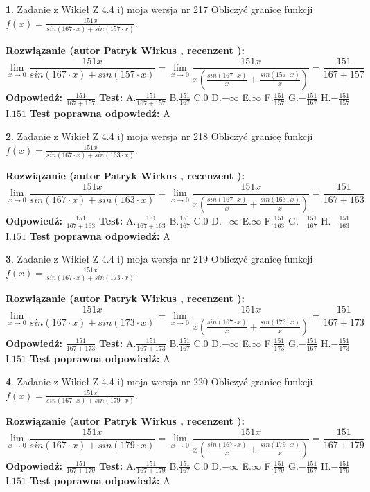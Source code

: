 \documentclass[12pt, a4paper]{article}
\theoremstyle{definition} %
\newtheorem{zad}{}
\newcommand{\zadStart}[1]{\begin{zad}#1\newline}
\newcommand{\zadStop}{\end{zad}}
\newcommand{\rozwStart}[2]{\noindent \textbf{Rozwiązanie (autor #1 , recenzent #2): }\newline}
\newcommand{\rozwStop}{\newline}
\newcommand{\odpStart}{\noindent \textbf{Odpowiedź:}\newline}
\newcommand{\odpStop}{\newline}
\newcommand{\testStart}{\noindent \textbf{Test:}\newline}
\newcommand{\testStop}{\newline}
\newcommand{\kluczStart}{\noindent \textbf{Test poprawna odpowiedź:}\newline}
\newcommand{\kluczStop}{\newline}
\begin{document}
\zadStart{Zadanie z Wikieł Z 4.4 i) moja wersja nr 217}
Obliczyć granicę funkcji $f(x)=\frac{151x}{sin(167\cdot x) +sin(157\cdot x)}$.
\zadStop
\rozwStart{Patryk Wirkus}{}
$$\lim\limits_{x\to 0}\frac{151x}{sin(167\cdot x) +sin(157\cdot x)}=\lim\limits_{x\to 0}\frac{151x}{x(\frac{sin(167\cdot x)}{x}+\frac{sin(157\cdot x)}{x})}=\frac{151}{167+157}$$
\rozwStop
\odpStart
$\frac{151}{167+157}$
\odpStop
\testStart
A.$\frac{151}{167+157}$
B.$\frac{151}{167}$
C.$0$
D.$-\infty$
E.$\infty$
F.$\frac{151}{157}$
G.$-\frac{151}{167}$
H.$-\frac{151}{157}$
I.$151$
\testStop
\kluczStart
A
\kluczStop



\zadStart{Zadanie z Wikieł Z 4.4 i) moja wersja nr 218}
Obliczyć granicę funkcji $f(x)=\frac{151x}{sin(167\cdot x) +sin(163\cdot x)}$.
\zadStop
\rozwStart{Patryk Wirkus}{}
$$\lim\limits_{x\to 0}\frac{151x}{sin(167\cdot x) +sin(163\cdot x)}=\lim\limits_{x\to 0}\frac{151x}{x(\frac{sin(167\cdot x)}{x}+\frac{sin(163\cdot x)}{x})}=\frac{151}{167+163}$$
\rozwStop
\odpStart
$\frac{151}{167+163}$
\odpStop
\testStart
A.$\frac{151}{167+163}$
B.$\frac{151}{167}$
C.$0$
D.$-\infty$
E.$\infty$
F.$\frac{151}{163}$
G.$-\frac{151}{167}$
H.$-\frac{151}{163}$
I.$151$
\testStop
\kluczStart
A
\kluczStop



\zadStart{Zadanie z Wikieł Z 4.4 i) moja wersja nr 219}
Obliczyć granicę funkcji $f(x)=\frac{151x}{sin(167\cdot x) +sin(173\cdot x)}$.
\zadStop
\rozwStart{Patryk Wirkus}{}
$$\lim\limits_{x\to 0}\frac{151x}{sin(167\cdot x) +sin(173\cdot x)}=\lim\limits_{x\to 0}\frac{151x}{x(\frac{sin(167\cdot x)}{x}+\frac{sin(173\cdot x)}{x})}=\frac{151}{167+173}$$
\rozwStop
\odpStart
$\frac{151}{167+173}$
\odpStop
\testStart
A.$\frac{151}{167+173}$
B.$\frac{151}{167}$
C.$0$
D.$-\infty$
E.$\infty$
F.$\frac{151}{173}$
G.$-\frac{151}{167}$
H.$-\frac{151}{173}$
I.$151$
\testStop
\kluczStart
A
\kluczStop



\zadStart{Zadanie z Wikieł Z 4.4 i) moja wersja nr 220}
Obliczyć granicę funkcji $f(x)=\frac{151x}{sin(167\cdot x) +sin(179\cdot x)}$.
\zadStop
\rozwStart{Patryk Wirkus}{}
$$\lim\limits_{x\to 0}\frac{151x}{sin(167\cdot x) +sin(179\cdot x)}=\lim\limits_{x\to 0}\frac{151x}{x(\frac{sin(167\cdot x)}{x}+\frac{sin(179\cdot x)}{x})}=\frac{151}{167+179}$$
\rozwStop
\odpStart
$\frac{151}{167+179}$
\odpStop
\testStart
A.$\frac{151}{167+179}$
B.$\frac{151}{167}$
C.$0$
D.$-\infty$
E.$\infty$
F.$\frac{151}{179}$
G.$-\frac{151}{167}$
H.$-\frac{151}{179}$
I.$151$
\testStop
\kluczStart
A
\kluczStop
\end{document}
